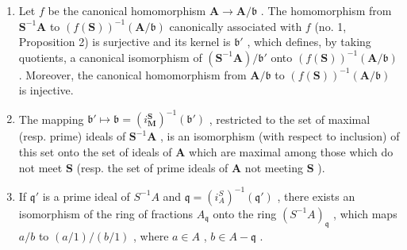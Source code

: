 \begin{enumerate}
\def\labelenumi{(\roman{enumi})}
\item
  Let \(f\) be the canonical homomorphism \(\mathbf{A} \to \mathbf{A} / \mathfrak{b}\) . The homomorphism from \(\mathbf{S}^{-1}\mathbf{A}\) to \((f(\mathbf{S}))^{-1}(\mathbf{A} / \mathfrak{b})\) canonically associated with \(f\) (no. 1, Proposition 2) is surjective and its kernel is \(\mathfrak{b}'\) , which defines, by taking quotients, a canonical isomorphism of \((\mathbf{S}^{-1}\mathbf{A}) / \mathfrak{b}'\) onto \((f(\mathbf{S}))^{-1}(\mathbf{A} / \mathfrak{b})\) . Moreover, the canonical homomorphism from \(\mathbf{A} / \mathfrak{b}\) to \((f(\mathbf{S}))^{-1}(\mathbf{A} / \mathfrak{b})\) is injective.
\item
  The mapping \(\mathfrak{b}' \mapsto \mathfrak{b} = (i_{\mathbf{M}}^{\mathbf{S}})^{-1}(\mathfrak{b}')\) , restricted to the set of maximal (resp. prime) ideals of \(\mathbf{S}^{-1}\mathbf{A}\) , is an isomorphism (with respect to inclusion) of this set onto the set of ideals of \(\mathbf{A}\) which are maximal among those which do not meet \(\mathbf{S}\) (resp. the set of prime ideals of \(\mathbf{A}\) not meeting \(\mathbf{S}\) ).
\item
  If \(\mathfrak{q}'\) is a prime ideal of \(S^{-1}A\) and \(\mathfrak{q} = (i_A^S)^{-1}(\mathfrak{q}')\) , there exists an isomorphism of the ring of fractions \(A_{\mathfrak{q}}\) onto the ring \((S^{-1}A)_{\mathfrak{q}}\) , which maps \(a/b\) to \((a/1)/(b/1)\) , where \(a \in A\) , \(b \in A - \mathfrak{q}\) .

\end{enumerate}

